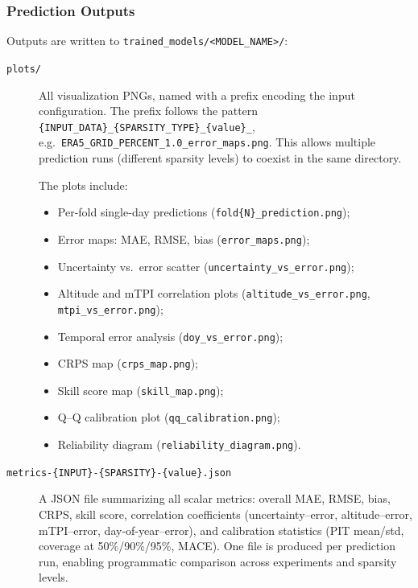 \subsubsection{Prediction Outputs}

Outputs are written to \texttt{trained\_models/<MODEL\_NAME>/}:

\begin{description}
  \item[\texttt{plots/}] All visualization PNGs, named with a prefix encoding the input configuration.
  The prefix follows the pattern \texttt{\{INPUT\_DATA\}\_\{SPARSITY\_TYPE\}\_\{value\}\_}, e.g.\ \texttt{ERA5\_GRID\_PERCENT\_1.0\_error\_maps.png}.
  This allows multiple prediction runs (different sparsity levels) to coexist in the same directory.

  The plots include:
  \begin{itemize}
    \item Per-fold single-day predictions (\texttt{fold\{N\}\_prediction.png});
    \item Error maps: MAE, RMSE, bias (\texttt{error\_maps.png});
    \item Uncertainty vs.\ error scatter (\texttt{uncertainty\_vs\_error.png});
    \item Altitude and mTPI correlation plots \newline (\texttt{altitude\_vs\_error.png}, \texttt{mtpi\_vs\_error.png});
    \item Temporal error analysis (\texttt{doy\_vs\_error.png});
    \item CRPS map (\texttt{crps\_map.png});
    \item Skill score map (\texttt{skill\_map.png});
    \item Q--Q calibration plot (\texttt{qq\_calibration.png});
    \item Reliability diagram (\texttt{reliability\_diagram.png}).
  \end{itemize}

  \item[\texttt{metrics-\{INPUT\}-\{SPARSITY\}-\{value\}.json}] A JSON file summarizing all scalar metrics: overall MAE, RMSE, bias, CRPS, skill score, correlation coefficients (uncertainty--error, altitude--error, mTPI--error, day-of-year--error), and calibration statistics (PIT mean/std, coverage at 50\%/90\%/95\%, MACE).
  One file is produced per prediction run, enabling programmatic comparison across experiments and sparsity levels.
\end{description}

